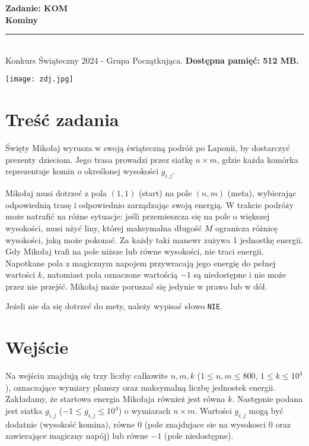 \documentclass[a4paper,11pt]{article}
\newcommand{\tasktitle}{Kominy}
\newcommand{\taskshort}{KOM}
\newcommand{\contestinfo}{Konkurs Świąteczny 2024 - Grupa Początkująca.}
\newcommand{\memorylimit}{512 MB}
\begin{document}
\noindent\textbf{\LARGE Zadanie: \taskshort} \\
\textbf{\Large \tasktitle} \\
\rule{\textwidth}{0.4pt} \\
\small \contestinfo \textbf{ Dostępna pamięć: \memorylimit.}

\begin{center}
\texttt{[image: zdj.jpg]}
\end{center}

\section*{Tre\'s\'c zadania}
\noindent\normalsize
Święty Mikołaj wyrusza w swoją świąteczną podróż po Laponii, by dostarczyć prezenty dzieciom. Jego trasa prowadzi przez siatkę \( n \times m \), gdzie każda komórka reprezentuje komin o określonej wysokości \( g_{i,j} \).

Mikołaj musi dotrzeć z pola \((1, 1)\) (start) na pole \((n, m)\) (meta), wybierając odpowiednią trasę i odpowiednio zarządzając swoją energią. W trakcie podróży może natrafić na różne sytuacje: jeśli przemieszcza się na pole o większej wysokości, musi użyć liny, której maksymalna długość \( M \) ogranicza różnicę wysokości, jaką może pokonać. Za każdy taki manewr zużywa 1 jednostkę energii. Gdy Mikołaj trafi na pole niższe lub równe wysokości, nie traci energii. Napotkane pola z magicznym napojem przywracają jego energię do pełnej wartości \( k \), natomiast pola oznaczone wartością \( -1 \) są niedostępne i nie może przez nie przejść. Mikołaj może poruszać się jedynie w prawo lub w dół.

Jeżeli nie da się dotrzeć do mety, należy wypisać słowo \texttt{NIE}.

\section*{Wejście}
Na wejściu znajdują się trzy liczby całkowite \( n, m, k \) ($1 \leq n, m \leq 800$, \( 1 \leq k \leq 10^4 \)), oznaczające wymiary planszy oraz maksymalną liczbę jednostek energii. Zakładamy, że startowa energia Mikołaja również jest równa $k$. Następnie podana jest siatka \( g_{i,j} \) ($-1 \leq g_{i,j} \leq 10^4$) o wymiarach \( n \times m \). Wartości \( g_{i,j} \) mogą być dodatnie (wysokość komina), równe 0 (pole znajdujace sie na wysokosci 0 oraz zawierające magiczny napój) lub równe \( -1 \) (pole niedostępne).
\end{document}
